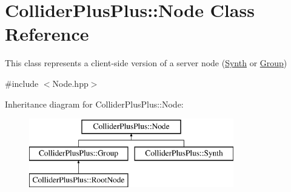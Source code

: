 \hypertarget{classColliderPlusPlus_1_1Node}{\section{Collider\-Plus\-Plus\-:\-:Node Class Reference}
\label{classColliderPlusPlus_1_1Node}
}


This class represents a client-\/side version of a server node (\hyperlink{classColliderPlusPlus_1_1Synth}{Synth} or \hyperlink{classColliderPlusPlus_1_1Group}{Group})  




{\ttfamily \#include $<$Node.\-hpp$>$}

Inheritance diagram for Collider\-Plus\-Plus\-:\-:Node\-:\begin{figure}[H]
\begin{center}
\leavevmode
\includegraphics[height=3.000000cm]{classColliderPlusPlus_1_1Node}
\end{center}
\end{figure}
